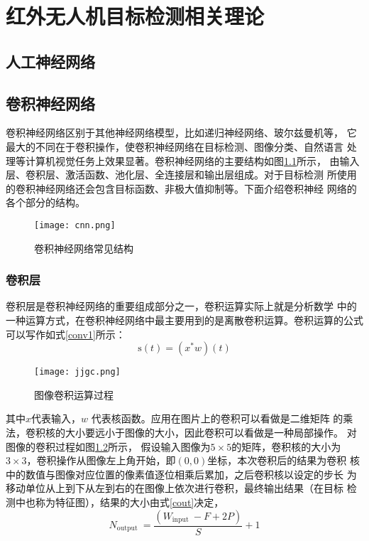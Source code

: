 \chapter{红外无人机目标检测相关理论}

\section{人工神经网络}

\section{卷积神经网络}
卷积神经网络区别于其他神经网络模型，比如递归神经网络、玻尔兹曼机等，
它最大的不同在于卷积操作，使卷积神经网络在目标检测、图像分类、自然语言
处理等计算机视觉任务上效果显著。卷积神经网络的主要结构如图\ref{cnn}所示，
由输入层、卷积层、激活函数、池化层、全连接层和输出层组成。对于目标检测
所使用的卷积神经网络还会包含目标函数、非极大值抑制等。下面介绍卷积神经
网络的各个部分的结构。

\begin{figure}[htbp]
    \centering
    \texttt{[image: cnn.png]}
    \caption{卷积神经网络常见结构}
    \label{cnn}
\end{figure}

\subsection{卷积层}
卷积层是卷积神经网络的重要组成部分之一，卷积运算实际上就是分析数学
中的一种运算方式，在卷积神经网络中最主要用到的是离散卷积运算。卷积运算的公式可以写作如式\ref{conv1}所示：
\begin{equation}
    \mathrm{s}(t)=\left(x^{*} w\right)(t)
    \label{conv1}
\end{equation}

\begin{figure}[htbp]
    \centering
    \texttt{[image: jjgc.png]}
    \caption{图像卷积运算过程}
    \label{jjgc}
\end{figure}

其中$x$代表输入，$w$ 代表核函数。应用在图片上的卷积可以看做是二维矩阵
的乘法，卷积核的大小要远小于图像的大小，因此卷积可以看做是一种局部操作。
对图像的卷积过程如图\ref{jjgc}所示，
假设输入图像为$5\times5$的矩阵，卷积核的大小为
$3\times3$，卷积操作从图像左上角开始，即$(0,0)$坐标，本次卷积后的结果为卷积
核中的数值与图像对应位置的像素值逐位相乘后累加，之后卷积核以设定的步长
为移动单位从上到下从左到右的在图像上依次进行卷积，最终输出结果（在目标
检测中也称为特征图），结果的大小由式\ref{cout}决定，
\begin{equation}
    N_{\text {output }}=\frac{\left(W_{\text {input }}-F+2 P\right)}{S}+1
    \label{cout}
\end{equation}

